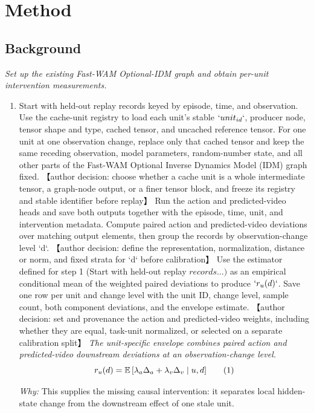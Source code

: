\documentclass[10pt,a4paper]{article}
\begin{document}
\section*{Method}
\subsection*{Background}
\emph{Set up the existing Fast-WAM Optional-IDM graph and obtain per-unit intervention measurements.}
\begin{enumerate}[leftmargin=*,start=1]
  \item Start with held-out replay records keyed by episode, time, and observation. Use the cache-unit registry to load each unit's stable \(`unit_{id}`\), producer node, tensor shape and type, cached tensor, and uncached reference tensor. For one unit at one observation change, replace only that cached tensor and keep the same receding observation, model parameters, random-number state, and all other parts of the Fast-WAM Optional Inverse Dynamics Model (IDM) graph fixed. 【author decision: choose whether a cache unit is a whole intermediate tensor, a graph-node output, or a finer tensor block, and freeze its registry and stable identifier before replay】 Run the action and predicted-video heads and save both outputs together with the episode, time, unit, and intervention metadata. Compute paired action and predicted-video deviations over matching output elements, then group the records by observation-change level `d`. 【author decision: define the representation, normalization, distance or norm, and fixed strata for `d` before calibration】 Use the estimator defined for step 1 (Start with held-out replay \(records\dots )\) as an empirical conditional mean of the weighted paired deviations to produce \(`r_{u}(d)`\). Save one row per unit and change level with the unit ID, change level, sample count, both component deviations, and the envelope estimate. 【author decision: set and provenance the action and predicted-video weights, including whether they are equal, task-unit normalized, or selected on a separate calibration split】
\noindent\emph{The unit-specific envelope combines paired action and predicted-video downstream deviations at an observation-change level.}
\begin{equation}
\resizebox{\ifdim\width>\linewidth \linewidth\else\width\fi}{!}{$\displaystyle r_u(d)=\mathbb{E}\left[\lambda_a\Delta_a+\lambda_v\Delta_v\mid u,d\right]$} \tag{1}
\end{equation}
\par\emph{Why:} This supplies the missing causal intervention: it separates local hidden-state change from the downstream effect of one stale unit.
\end{enumerate}
\end{document}
